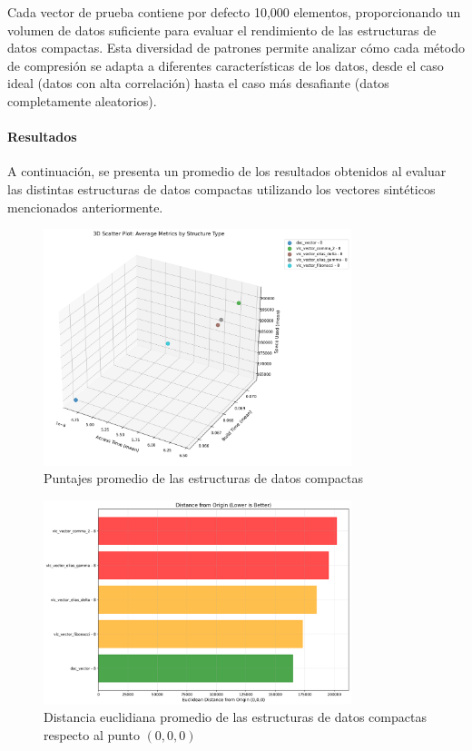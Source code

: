 Cada vector de prueba contiene por defecto 10,000 elementos, proporcionando un volumen de datos suficiente para evaluar el rendimiento de las estructuras de datos compactas. Esta diversidad de patrones permite analizar cómo cada método de compresión se adapta a diferentes características de los datos, desde el caso ideal (datos con alta correlación) hasta el caso más desafiante (datos completamente aleatorios).

\paragraph{Resultados}
A continuación, se presenta un promedio de los resultados obtenidos al evaluar las distintas estructuras de datos compactas utilizando los vectores sintéticos mencionados anteriormente.

\begin{figure}[H]
\centering
\includegraphics[width=0.8\textwidth]{alternatives/scatter_plot/3d_scatter_plot_structures.png}
\caption{Puntajes promedio de las estructuras de datos compactas}   
\label{fig:scatter_plot_structures}
\end{figure}

\begin{figure}[H]
\centering
\includegraphics[width=0.8\textwidth]{alternatives/scatter_plot/euclidean_distance_from_ideal.png}
\caption{Distancia euclidiana promedio de las estructuras de datos compactas respecto al punto $(0, 0, 0)$}   
\label{fig:euclidian_distance_from_ideal}
\end{figure}

